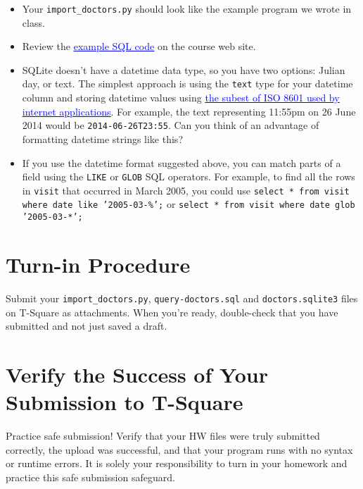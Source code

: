 \documentclass[12pt]{article}
\newcommand{\link}[2]{\href{#1}{\textcolor{blue}{\underline{#2}}}}
\newcommand{\code}{http://www.cc.gatech.edu/~simpkins/teaching/gatech/cs2316/code}
\begin{document}
\begin{itemize}
\itemsep0em
\item Your {\tt import\_doctors.py} should look like the example program we wrote in class.
\item Review the \link{\code/databases}{example SQL code} on the course web site.
\item SQLite doesn't have a datetime data type, so you have two options: Julian day, or text.  The simplest approach is using the {\tt text} type for your datetime column and storing datetime values using \link{http://www.w3.org/TR/NOTE-datetime}{the subest of ISO 8601 used by internet applications}.  For example, the text representing 11:55pm on 26 June 2014 would be {\tt 2014-06-26T23:55}.  Can you think of an advantage of formatting datetime strings like this?
\item If you use the datetime format suggested above, you can match parts of a field using the {\tt LIKE} or {\tt GLOB} SQL operators.  For example, to find all the rows in {\tt visit} that occurred in March 2005, you could use {\tt  select * from visit where date like '2005-03-\%';} or {\tt select * from visit where date glob '2005-03-*';}
\end{itemize}

\section{Turn-in Procedure}

Submit your {\tt import\_doctors.py}, {\tt query-doctors.sql} and {\tt doctors.sqlite3} files on T-Square as attachments.  When you're ready, double-check that you have submitted and not just saved a draft.

\section{Verify the Success of Your Submission to T-Square}

Practice safe submission! Verify that your HW files were truly submitted correctly, the upload was successful, and that your program runs with no syntax or runtime errors. It is solely your responsibility to turn in your homework and practice this safe submission safeguard.
\end{document}
